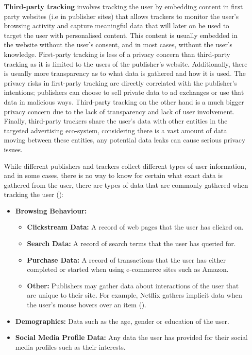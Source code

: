 \documentclass{l4proj}
\begin{document}
\textbf{Third-party tracking} involves tracking the user by embedding content in first party websites (i.e in publisher sites) that allows trackers to monitor the user's browsing activity and capture meaningful data that will later on be used to target the user with personalised content. This content is usually embedded in the website without the user's consent, and in most cases, without the user's knowledge.
First-party tracking is less of a privacy concern than third-party tracking as it is limited to the users of the publisher's website. Additionally, there is usually more transparency as to what data is gathered and how it is used. The privacy risks in first-party tracking are directly correlated with the publisher's intentions; publishers can choose to sell private data to ad exchanges or use that data in malicious ways. Third-party tracking on the other hand is a much bigger privacy concern due to the lack of transparency and lack of user involvement. Finally, third-party trackers share the user's data with other entities in the targeted advertising eco-system, considering there is a vast amount of data moving between these entities, any potential data leaks can cause serious privacy issues. 

While different publishers and trackers collect different types of user information, and in some cases, there is no way to know for certain what exact data is gathered from the user, there are types of data that are commonly gathered when tracking the user (\cite{addata}):
\begin{itemize}
   \item 
   \textbf{Browsing Behaviour:}
   \begin{itemize}
	\item
           \textbf{Clickstream Data:} A record of web pages that the user has clicked on.
	\item
           \textbf{Search Data:} A record of search terms that the user has queried for.
	\item
           \textbf{Purchase Data:} A record of transactions that the user has either completed or started when using e-commerce sites such as Amazon.
	\item
           \textbf{Other:} Publishers may gather data about interactions of the user that are unique to their site. For example, Netflix gathers implicit data when the user's mouse hovers over an item (\cite{netflix}).
   \end{itemize}
   \item
   \textbf{Demographics:} Data such as the age, gender or education of the user.
   \item
   \textbf{Social Media Profile Data:} Any data the user has provided for their social media profiles such as their interests. 
\end{itemize}
\end{document}
